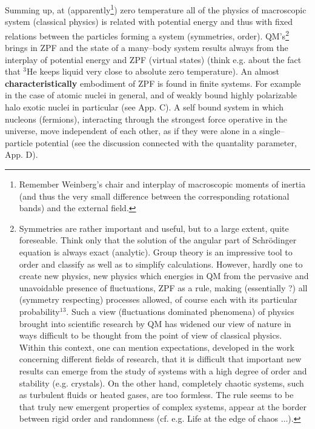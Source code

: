 \documentclass[a4paper,onecolumn,superscriptaddress,12pt,nofootinbib,twoside,raggedfooter,notitlepage]{revtex4-1}
\begin{document}
\pagebreak

Summing up, at (apparently\footnote{Remember Weinberg's chair and interplay of macroscopic moments of inertia (and thus the very small difference between the corresponding rotational bands) and the external field.}) zero temperature all of the physics of macroscopic system (classical physics) is related with potential energy and thus with fixed relations between the particles forming a system (symmetries, order). QM's\footnote{Symmetries are rather important and useful, but to a large extent, quite foreseable. Think only that the solution of the angular part of Schr\"odinger equation is always exact (analytic). Group theory is an impressive tool to order and classify as well as to simplify calculations. However, hardly one to create new physics, new physics which energies in QM from the pervasive and unavoidable presence of fluctuations, ZPF as a rule, making (essentially ?) all (symmetry respecting) processes allowed, of course each with its particular probability$^{13}$. Such a view (fluctuations dominated phenomena) of physics brought into scientific research by QM has widened our view of nature in ways difficult to be thought from the point of view of classical physics. Within this context, one can mention expectations, developed in the work concerning different fields of research, that it is difficult that important new results can emerge from the study of systems with a high degree of order and stability (e.g. crystals). On the other hand, completely chaotic systems, such as turbulent fluids or heated gases, are too formless. The rule seems to be that truly new emergent properties of complex systems, appear at the border between rigid order and randomness (cf. e.g. Life at the edge of chaos $\ldots$).} brings in ZPF and the state of a many--body system results always from the interplay of potential energy and ZPF (virtual states) (think e.g. about the fact that ${}^3$He keeps liquid very close to absolute zero temperature). An almost \textbf{characteristically} embodiment of ZPF is found in finite systems. For example in the case of atomic nuclei in general, and of weakly bound highly polarizable halo exotic nuclei in particular (see App. C). A self bound system in which nucleons (fermions), interacting through the strongest force operative in the universe, move independent of each other, as if they were alone in a single--particle potential (see the discussion connected with the quantality parameter, App. D).

\end{document}
